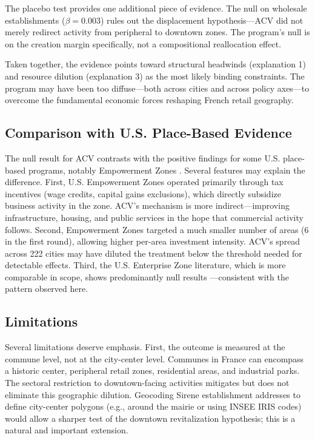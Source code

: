 \documentclass[12pt]{article}
\begin{document}
The placebo test provides one additional piece of evidence. The null on wholesale establishments ($\beta = 0.003$) rules out the displacement hypothesis---ACV did not merely redirect activity from peripheral to downtown zones. The program's null is on the creation margin specifically, not a compositional reallocation effect.

Taken together, the evidence points toward structural headwinds (explanation 1) and resource dilution (explanation 3) as the most likely binding constraints. The program may have been too diffuse---both across cities and across policy axes---to overcome the fundamental economic forces reshaping French retail geography.

\subsection{Comparison with U.S. Place-Based Evidence}

The null result for ACV contrasts with the positive findings for some U.S. place-based programs, notably Empowerment Zones \citep{busso2013assessing}. Several features may explain the difference. First, U.S. Empowerment Zones operated primarily through tax incentives (wage credits, capital gains exclusions), which directly subsidize business activity in the zone. ACV's mechanism is more indirect---improving infrastructure, housing, and public services in the hope that commercial activity follows. Second, Empowerment Zones targeted a much smaller number of areas (6 in the first round), allowing higher per-area investment intensity. ACV's spread across 222 cities may have diluted the treatment below the threshold needed for detectable effects. Third, the U.S. Enterprise Zone literature, which is more comparable in scope, shows predominantly null results \citep{neumark2004enterprise, neumark2015place}---consistent with the pattern observed here.

\subsection{Limitations}

Several limitations deserve emphasis. First, the outcome is measured at the commune level, not at the city-center level. Communes in France can encompass a historic center, peripheral retail zones, residential areas, and industrial parks. The sectoral restriction to downtown-facing activities mitigates but does not eliminate this geographic dilution. Geocoding Sirene establishment addresses to define city-center polygons (e.g., around the mairie or using INSEE IRIS codes) would allow a sharper test of the downtown revitalization hypothesis; this is a natural and important extension.
\end{document}
